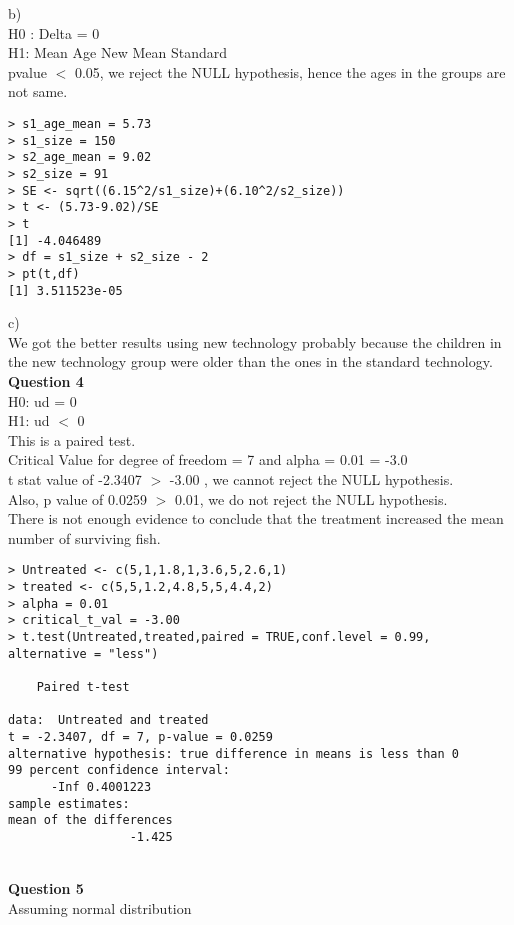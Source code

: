 \documentclass[12pt,letterpaper]{article}
\begin{document}
{b)}\\
H0 : Delta = 0\\
H1: Mean Age New \neq Mean Standard \\

pvalue $<$ 0.05, we reject the NULL hypothesis, hence the ages in the groups are not same. 


\begin{lstlisting}[label=R Code,caption=Q3(a) R Code Output]
 > s1_age_mean = 5.73
> s1_size = 150
> s2_age_mean = 9.02
> s2_size = 91
> SE <- sqrt((6.15^2/s1_size)+(6.10^2/s2_size))
> t <- (5.73-9.02)/SE
> t
[1] -4.046489
> df = s1_size + s2_size - 2
> pt(t,df)
[1] 3.511523e-05

\end{lstlisting}

{c)}\\
We got the better results using new technology probably because the children in the new technology group were older than the ones in the standard technology. \\

{\Large \textbf{Question 4}}\\
H0: ud = 0\\
H1: ud  $<$  0\\
This is a paired test. \\

Critical Value for degree of freedom = 7 and alpha = 0.01 = -3.0\\
t stat value of -2.3407 $>$ -3.00 , we cannot reject the NULL hypothesis.\\
Also, p value of 0.0259 $>$ 0.01, we do not reject the NULL hypothesis.\\

There is not enough evidence to conclude that the treatment increased the mean number of surviving fish. \\

\begin{lstlisting}[label=R Code,caption=Q4 R Code Output]
 > Untreated <- c(5,1,1.8,1,3.6,5,2.6,1)
> treated <- c(5,5,1.2,4.8,5,5,4.4,2)
> alpha = 0.01
> critical_t_val = -3.00
> t.test(Untreated,treated,paired = TRUE,conf.level = 0.99,
alternative = "less")

	Paired t-test

data:  Untreated and treated
t = -2.3407, df = 7, p-value = 0.0259
alternative hypothesis: true difference in means is less than 0
99 percent confidence interval:
      -Inf 0.4001223
sample estimates:
mean of the differences 
                 -1.425 

\end{lstlisting}
\\
{\Large \textbf{Question 5}} \\
Assuming normal distribution\\
\end{document}
